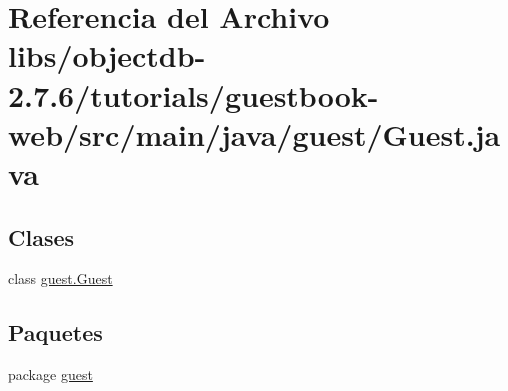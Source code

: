 \hypertarget{guestbook-web_2src_2main_2java_2guest_2_guest_8java}{}\section{Referencia del Archivo libs/objectdb-\/2.7.6/tutorials/guestbook-\/web/src/main/java/guest/\+Guest.java}
\label{guestbook-web_2src_2main_2java_2guest_2_guest_8java}
\subsection*{Clases}
\begin{DoxyCompactItemize}
\item 
class \mbox{\hyperlink{classguest_1_1_guest}{guest.\+Guest}}
\end{DoxyCompactItemize}
\subsection*{Paquetes}
\begin{DoxyCompactItemize}
\item 
package \mbox{\hyperlink{namespaceguest}{guest}}
\end{DoxyCompactItemize}
